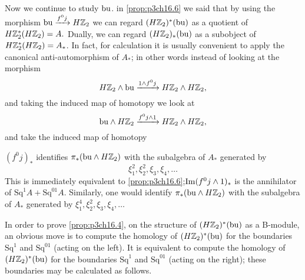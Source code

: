 \documentclass[../main]{subfiles}
\begin{document}
Now we continue to study $\mathrm{bu}$. in \ref{prop:p3ch16.6} we said that by using the morphism $\te{bu} \vra{f^0j} H\bZ_2$ we can regard $(H\mathbb{Z}_2)^{\ast}(\mathrm{bu})$ as a quotient of $H\mathbb{Z}_2^{\ast}(H\mathbb{Z}_2)=A.$ Dually, we can regard $(H\mathbb{Z}_2)_{\ast}(\mathrm{bu}) $ as a subobject of $H\mathbb{Z}_2^{\ast}(H\mathbb{Z}_2)=A_{\ast}$. In fact, for calculation it is usually convenient to apply the canonical anti-automorphism of $A_{\ast}$; in other words instead of looking at the morphism \begin{equation*}
    H\bZ_2\wedge \te{bu}\vra{1 \wedge f^{0}j} H\bZ_2 \wedge H\bZ_2, 
\end{equation*}
and taking the induced map of homotopy we look at \begin{equation*}
    \te{bu}\wedge H\bZ_2 \vra{f^{0}j \wedge1 } H\bZ_2 \wedge H\bZ_2, 
\end{equation*}
and take the induced map of homotopy 
\begin{lemma} \label{lem:p3ch16.8}
 $(f^{0}j)_{\ast}$ identifies $\pi_{\ast}(\mathrm{bu} \wedge H\mathbb{Z}_2)$ with the subalgebra of $A_{\ast}$ generated by \begin{equation*}
     \xi_{1}^{2}, \xi_{2}^{2}, \xi_{3}, \xi_{4}, \dots
 \end{equation*}
 This is immediately equivalent to \ref{prop:p3ch16.6};$\mathrm{Im}(f^{0}j\wedge1)_{\ast}$ is the annihilator of $\mathrm{Sq}^{1}A+\mathrm{Sq}^{01}A.$
 Similarly, one would identify $\pi_{\ast}(\mathrm{bu} \wedge H\mathbb{Z}_2)$ with the subalgebra of $A_{\ast}$ generated by $\xi_{1}^{4}, \xi_{2}^{2}, \xi_{3}, \xi_{4}, \dots$
\end{lemma}
In order to prove \ref{prop:p3ch16.4}, on the structure of $(H\mathbb{Z}_2)^{\ast}(\mathrm{bu})$ as a B-module, an obvious move is to compute the homology of $(H\mathbb{Z}_2)^{\ast}(\mathrm{bu})$ for the boundaries $\mathrm{Sq}^{1}$ and $\mathrm{Sq}^{01}$ (acting on the left). It is equivalent to compute the homology of $(H\mathbb{Z}_2)^{\ast}(\mathrm{bu})$ for the boundaries $\mathrm{Sq}^{1}$ and $\mathrm{Sq}^{01}$ (acting on the right); these boundaries may be calculated as follows.
\end{document}

